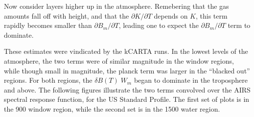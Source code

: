\documentclass[11pt]{article}
\begin{document}
Now consider layers higher up in the atmosphere. Remebering that the gas 
amounts fall off with height, and that the $\partial K/\partial T$ depends on
$K$, this term rapidly becomes smaller than $\partial B_{m}/\partial T$, 
leading one to expect the $\partial B_{m}/\partial T$ term to dominate.

These estimates were vindicated by the \textsf{kCARTA} runs. In the lowest 
levels of the atmosphere, the two terms were of similar magnitude in the 
window regions, while though small in magnitude, the planck term was larger 
in the ``blacked out'' regions. For both regions, the 
$\delta B(T) \; W_{m}$ began to dominate in the troposphere and above. The 
following figures illustrate the two terms convolved over the AIRS spectral 
response function, for the US Standard Profile. The first set of plots is in 
the 900 \wn window region, while the second set is in the 1500 \wn water 
region.




\end{document}
